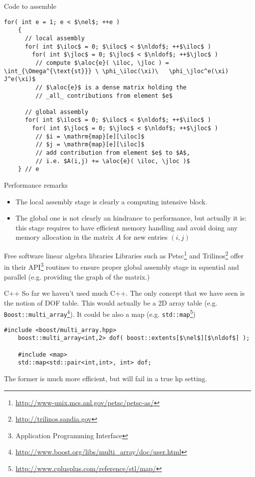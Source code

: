 \begin{frame}[containsverbatim]{Code to assemble}
  \begin{lstlisting}[mathescape,texcl]
    for( int e = 1; e < $\nel$; ++e )
    {
      // local assembly
      for( int $\iloc$ = 0; $\iloc$ < $\nldof$; ++$\iloc$ )
        for( int $\jloc$ = 0; $\jloc$ < $\nldof$; ++$\jloc$ )
         // compute $\aloc{e}( \iloc, \jloc ) = \int_{\Omega^{\text{st}}} \ \phi_\iloc(\xi)\   \phi_\jloc^e(\xi)  J^e(\xi)$
         // $\aloc{e}$ is a dense matrix holding the 
         // _all_ contributions from element $e$

      // global assembly      
      for( int $\iloc$ = 0; $\iloc$ < $\nldof$; ++$\iloc$ )
        for( int $\jloc$ = 0; $\jloc$ < $\nldof$; ++$\jloc$ )
         // $i = \mathrm{map}[e][\iloc]$
         // $j = \mathrm{map}[e][\iloc]$
         // add contribution from element $e$ to $A$, 
         // i.e. $A(i,j) += \aloc{e}( \iloc, \jloc )$
    } // e
  \end{lstlisting}
\end{frame}

\begin{frame}{Performance remarks}
  
  \begin{itemize}
  \item The local assembly stage is clearly a computing intensive block. 
  \item The global one is not clearly an hindrance to performance, but
    actually it is: this stage requires to have efficient memory
    handling and avoid doing any memory allocation in the matrix $A$ for new entries $(i,j)$
  \end{itemize}
  \begin{block}{Free software linear algebra libraries}
    Libraries such as
    Petsc\footnote{\url{http://www-unix.mcs.anl.gov/petsc/petsc-as/}}
    and Trilinos\footnote{\url{http://trilinos.sandia.gov}} offer in
    their API\footnote{Application Programming Interface} routines to ensure proper global assembly stage in
    squential and parallel (e.g. providing the graph of the matrix.)
  \end{block}
\end{frame}

\begin{frame}[containsverbatim]{C++}
  So far we haven't used much C++. The only concept that we have seen
  is the notion of DOF table. This would actually be a 2D array table
  (e.g. \lstinline{Boost::multi_array}\footnote{\url{http://www.boost.org/libs/multi_array/doc/user.html}}). It could be also a map
  (e.g. \lstinline{std::map}\footnote{\url{http://www.cplusplus.com/reference/stl/map/}})
  
  \begin{lstlisting}[mathescape]
    #include <boost/multi_array.hpp>
    boost::multi_array<int,2> dof( boost::extents[$\nel$][$\nldof$] );

    #include <map>
    std::map<std::pair<int,int>, int> dof;
  \end{lstlisting}
  The former is much more efficient, but will fail in a true hp setting. 
\end{frame}
